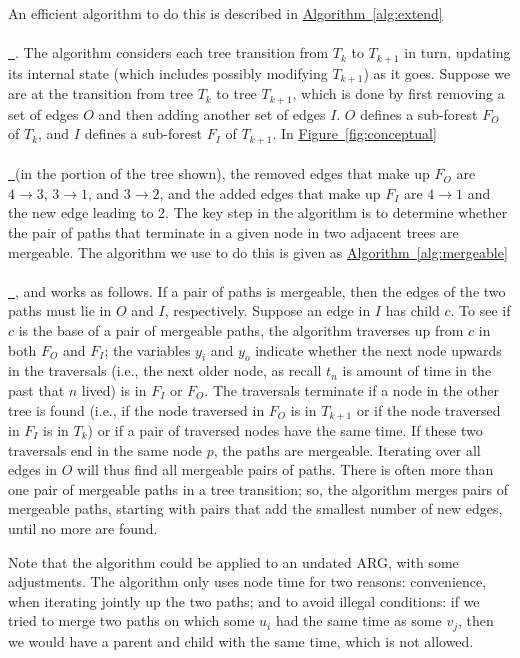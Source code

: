 \documentclass[10pt,twoside,lineno]{gsajnl}
\newcommand{\tskit}{\texttt{tskit}}
\newcommand{\algorithmref}[2][]{%
	\hyperref[{#2}]{%
		Algorithm~\ref*{#2}%
		\ifx\\#1\\%
		\else
		\,#1%
		\fi
	}%
}
\newcommand*{\figref}[2][]{%
	\hyperref[{#2}]{%
		Figure~\ref*{#2}%
		\ifx\\#1\\%
		\else
		\,#1%
		\fi
	}%
}
\begin{document}
An efficient algorithm to do this is described in \algorithmref{alg:extend}.
The algorithm considers each tree transition from $T_k$ to $T_{k+1}$ in turn, updating its internal state
(which includes possibly modifying $T_{k+1}$) as it goes. 
Suppose we are at the transition from tree $T_k$ to tree $T_{k+1}$,
which is done by first removing a set of edges $O$
and then adding another set of edges $I$.
$O$ defines a sub-forest $F_O$ of $T_k$,
and $I$ defines a sub-forest $F_I$ of $T_{k+1}$.
In \figref{fig:conceptual} (in the portion of the tree shown),
the removed edges that make up $F_O$
are $4 \to 3$, $3 \to 1$, and $3 \to 2$,
and the added edges that make up $F_I$ are $4 \to 1$ and the new edge leading to 2.
The key step in the algorithm is to determine whether the pair of paths
that terminate in a given node in two adjacent trees are mergeable.
The algorithm we use to do this is given as \algorithmref{alg:mergeable},
and works as follows.
If a pair of paths is mergeable,
then the edges of the two paths must lie in $O$ and $I$, respectively.
Suppose an edge in $I$ has child $c$.
To see if $c$ is the base of a pair of mergeable paths,
the algorithm traverses up from $c$ in both $F_O$ and $F_I$;
the variables $y_i$ and $y_o$ indicate whether the next node upwards in the traversals
(i.e., the next older node, as recall $t_n$ is amount of time in the past that $n$ lived)
is in $F_I$ or $F_O$.
The traversals terminate if a node in the other tree is found
(i.e., if the node traversed in $F_O$ is in $T_{k+1}$ or if the node traversed in $F_I$ is in $T_k$)
or if a pair of traversed nodes have the same time.
If these two traversals end in the same node $p$, the paths are mergeable.
Iterating over all edges in $O$ will thus find all mergeable pairs of paths.
There is often more than one pair of mergeable paths in a tree transition;
so, the algorithm merges pairs of mergeable paths,
starting with pairs that add the smallest number of new edges,
until no more are found.

Note that the algorithm could be applied to an undated ARG,
with some adjustments.
The algorithm only uses node time for two reasons:
convenience, when iterating jointly up the two paths;
and to avoid illegal conditions: if we tried to merge two paths on which
some $u_i$ had the same time as some $v_j$,
then we would have a parent and child with the same time, which is not allowed.
\end{document}
